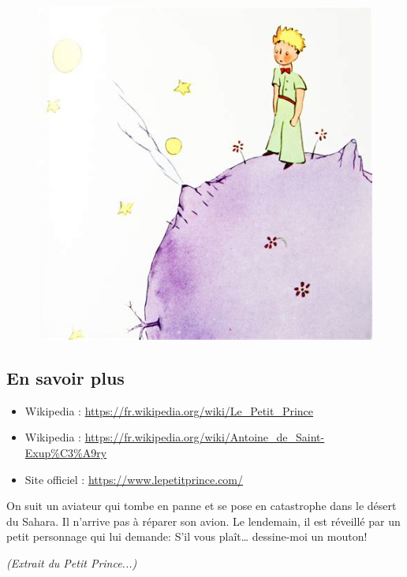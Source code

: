 \begin{multicols}{2}

  \begin{figure}[H]
    \centering
    \includegraphics[width=0.8\linewidth]{5x6-calcul-litteral/pp.png}
  \end{figure}

\subsection*{En savoir plus}

\begin{itemize}
\item Wikipedia : \url{https://fr.wikipedia.org/wiki/Le_Petit_Prince}
\item Wikipedia : \url{https://fr.wikipedia.org/wiki/Antoine_de_Saint-Exup%C3%A9ry}
\item Site officiel : \url{https://www.lepetitprince.com/}
\end{itemize}


On suit un aviateur qui tombe en panne et se pose en catastrophe dans le désert du Sahara. Il n’arrive pas à réparer son avion. Le lendemain, il est réveillé par un petit personnage qui lui demande: \og S'il vous plaît… dessine-moi un mouton! \fg 

\end{multicols}

\newpage

\textit{(Extrait du Petit Prince...)}


